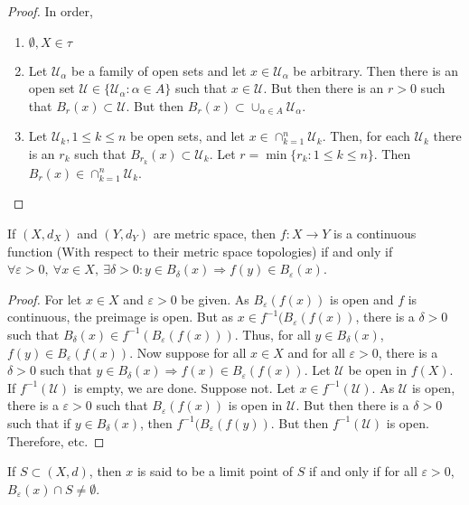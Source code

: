 \documentclass[crop=false,class=book,oneside]{standalone}
\begin{document}
            \begin{proof}
            In order,
            \begin{enumerate}
            \item $\emptyset, X \in \tau$
            \item Let $\mathcal{U}_{\alpha}$ be a family of open sets and let $x\in \mathcal{U}_{\alpha}$ be arbitrary. Then there is an open set $\mathcal{U} \in \{\mathcal{U}_{\alpha}:\alpha\in A\}$ such that $x\in \mathcal{U}$. But then there is an $r>0$ such that $B_{r}(x)\subset\mathcal{U}$. But then $B_{r}(x) \subset \cup_{\alpha \in A}\mathcal{U}_{\alpha}$.
            \item Let $\mathcal{U}_{k}, 1\leq k \leq n$ be open sets, and let $x\in \cap_{k=1}^{n} \mathcal{U}_k$. Then, for each $\mathcal{U}_k$ there is an $r_{k}$ such that $B_{r_k}(x)\subset \mathcal{U}_{k}$. Let $r = \min\{r_k:1\leq k \leq n\}$. Then $B_{r}(x) \in \cap_{k=1}^{n}\mathcal{U}_k$.
            \end{enumerate}
            \end{proof}
            \begin{theorem}
            If $(X,d_X)$ and $(Y,d_Y)$ are metric space, then $f:X\rightarrow Y$ is a continuous function (With respect to their metric space topologies) if and only if $\forall \varepsilon>0,\ \forall x\in X,\ \exists \delta>0:y\in B_{\delta}(x)\Rightarrow f(y) \in B_{\varepsilon}(x)$.
            \end{theorem}
            \begin{proof}
            For let $x\in X$ and $\varepsilon>0$ be given. As $B_{\varepsilon}(f(x))$ is open and $f$ is continuous, the preimage is open. But as $x\in f^{-1}(B_{\varepsilon}(f(x))$, there is a $\delta>0$ such that $B_{\delta}(x)\in f^{-1}(B_{\varepsilon}(f(x)))$. Thus, for all $y \in B_{\delta}(x)$, $f(y) \in B_{\varepsilon}(f(x))$. Now suppose for all $x\in X$ and for all $\varepsilon>0$, there is a $\delta>0$ such that $y\in B_{\delta}(x)\Rightarrow f(x) \in B_{\varepsilon}(f(x))$. Let $\mathcal{U}$ be open in $f(X)$. If $f^{-1}(\mathcal{U})$ is empty, we are done. Suppose not. Let $x\in f^{-1}(\mathcal{U})$. As $\mathcal{U}$ is open, there is a $\varepsilon>0$ such that $B_{\varepsilon}(f(x))$ is open in $\mathcal{U}$. But then there is a $\delta>0$ such that if $y\in B_{\delta}(x)$, then $f^{-1}(B_{\varepsilon}(f(y))$. But then $f^{-1}(\mathcal{U})$ is open. Therefore, etc.
            \end{proof}
            \begin{definition}
            If $S\subset (X,d)$, then $x$ is said to be a limit point of $S$ if and only if for all $\varepsilon>0$, $B_{\varepsilon}(x)\cap S \ne \emptyset$.
            \end{definition}
\end{document}
